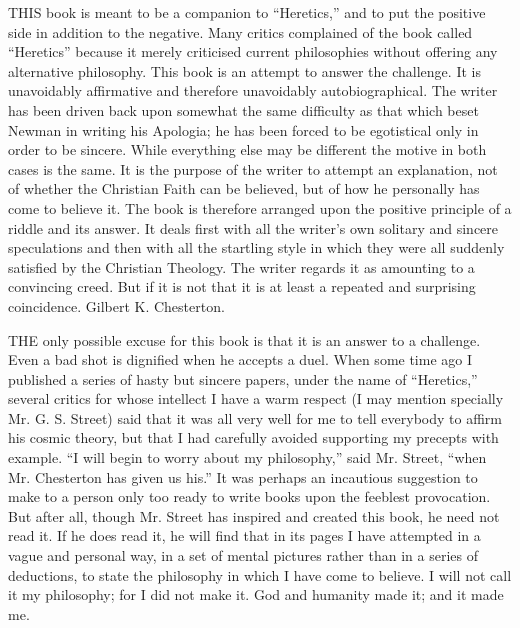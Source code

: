 
THIS book is meant to be a companion to “Heretics,” and to put the positive side in addition to the negative. Many critics complained of the book called “Heretics” because it merely criticised current philosophies without offering any alternative philosophy. This book is an attempt to answer the challenge. It is unavoidably affirmative and therefore unavoidably autobiographical. The writer has been driven back upon somewhat the same difficulty as that which beset Newman in writing his Apologia; he has been forced to be egotistical only in order to be sincere. While everything else may be different the motive in both cases is the same. It is the purpose of the writer to attempt an explanation, not of whether the Christian Faith can be believed, but of how he personally has come to believe it. The book is therefore arranged upon the positive principle of a riddle and its answer. It deals first with all the writer’s own solitary and sincere speculations and then with all the startling style in which they were all suddenly satisfied by the Christian Theology. The writer regards it as amounting to a convincing creed. But if it is not that it is at least a repeated and surprising coincidence. Gilbert K. Chesterton.


THE only possible excuse for this book is that it is an answer to a challenge. Even a bad shot is dignified when he accepts a duel. When some time ago I published a series of hasty but sincere papers, under the name of “Heretics,” several critics for whose intellect I have a warm respect (I may mention specially Mr. G. S. Street) said that it was all very well for me to tell everybody to affirm his cosmic theory, but that I had carefully avoided supporting my precepts with example. “I will begin to worry about my philosophy,” said Mr. Street, “when Mr. Chesterton has given us his.” It was perhaps an incautious suggestion to make to a person only too ready to write books upon the feeblest provocation. But after all, though Mr. Street has inspired and created this book, he need not read it. If he does read it, he will find that in its pages I have attempted in a vague and personal way, in a set of mental pictures rather than in a series of deductions, to state the philosophy in which I have come to believe. I will not call it my philosophy; for I did not make it. God and humanity made it; and it made me.

